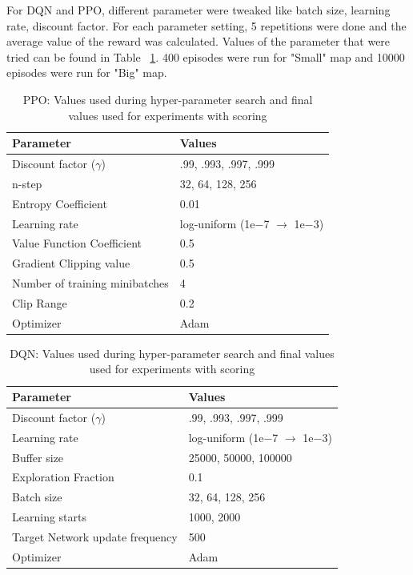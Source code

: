 \documentclass[12pt]{report}
\begin{document}
For DQN and PPO, different parameter were tweaked like batch size, learning rate, discount factor. For each parameter setting, 5 repetitions were done and the average value of the reward was calculated. Values of the parameter that were tried can be found in Table ~\ref{table:DQNRangesHyperparameter}. 400 episodes were run for "Small" map and 10000 episodes were run for "Big" map. 

\begin{table} [!h]
\begin{center}
 \begin{tabular}{l | l} 
 \hline
 Parameter & Values \\ [0.5ex] 
 \hline\hline
 Discount factor ($\gamma$) & {.99, .993, .997, .999}\\
 n-step & {32, 64, 128, 256}\\
 Entropy Coefficient & 0.01\\
 Learning rate & log-uniform (1e−7 $\rightarrow$ 1e−3) \\
 Value Function Coefficient & 0.5 \\
 Gradient Clipping value & 0.5 \\
 Number of training minibatches & 4 \\
 Clip Range & 0.2\\
 Optimizer & Adam \\ 
 \hline
\end{tabular}
\caption{PPO: Values used during hyper-parameter search and final values used for experiments with scoring}
\label{table:DQNRangesHyperparameter}
\end{center}
\end{table}

\begin{table} [!h]
\begin{center}
 \begin{tabular}{l | l } 
 \hline
 Parameter & Values  \\ [0.5ex] 
 \hline\hline
 Discount factor ($\gamma$) & {.99, .993, .997, .999}\\ 
 Learning rate & log-uniform (1e−7 $\rightarrow$ 1e−3) \\
 Buffer size & {25000, 50000, 100000} \\
 Exploration Fraction & 0.1\\
 Batch size & {32, 64, 128, 256} \\
 Learning starts & {1000, 2000} \\
 Target Network update frequency & 500\\
 Optimizer & Adam \\ 
 \hline
\end{tabular}
\caption{DQN: Values used during hyper-parameter search and final values used for experiments with scoring}
\label{table:PPORangesHyperparameter}
\end{center}
\end{table}
\end{document}

